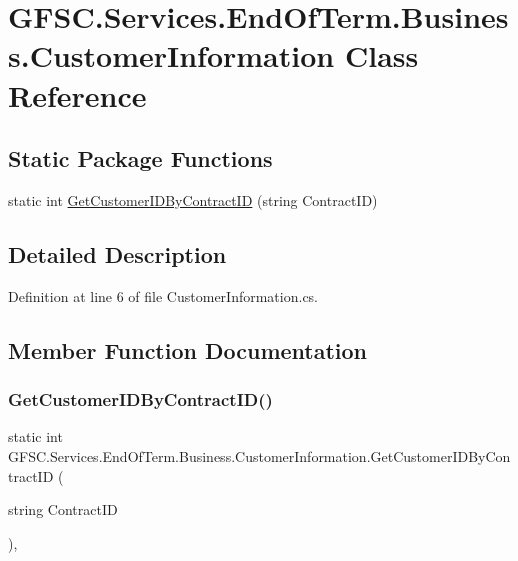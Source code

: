\hypertarget{class_g_f_s_c_1_1_services_1_1_end_of_term_1_1_business_1_1_customer_information}{}\section{G\+F\+S\+C.\+Services.\+End\+Of\+Term.\+Business.\+Customer\+Information Class Reference}
\label{class_g_f_s_c_1_1_services_1_1_end_of_term_1_1_business_1_1_customer_information}
\subsection*{Static Package Functions}
\begin{DoxyCompactItemize}
\item 
static int \mbox{\hyperlink{class_g_f_s_c_1_1_services_1_1_end_of_term_1_1_business_1_1_customer_information_a23212d619a168b7a851a3e713fbb49a8}{Get\+Customer\+I\+D\+By\+Contract\+ID}} (string Contract\+ID)
\end{DoxyCompactItemize}


\subsection{Detailed Description}


Definition at line 6 of file Customer\+Information.\+cs.



\subsection{Member Function Documentation}
\mbox{\label{class_g_f_s_c_1_1_services_1_1_end_of_term_1_1_business_1_1_customer_information_a23212d619a168b7a851a3e713fbb49a8}} 
\subsubsection{\texorpdfstring{Get\+Customer\+I\+D\+By\+Contract\+I\+D()}{GetCustomerIDByContractID()}}
{\footnotesize\ttfamily static int G\+F\+S\+C.\+Services.\+End\+Of\+Term.\+Business.\+Customer\+Information.\+Get\+Customer\+I\+D\+By\+Contract\+ID (\begin{DoxyParamCaption}\item[{string}]{Contract\+ID }\end{DoxyParamCaption})\hspace{0.3cm}{\ttfamily [static]}, {\ttfamily [package]}}



